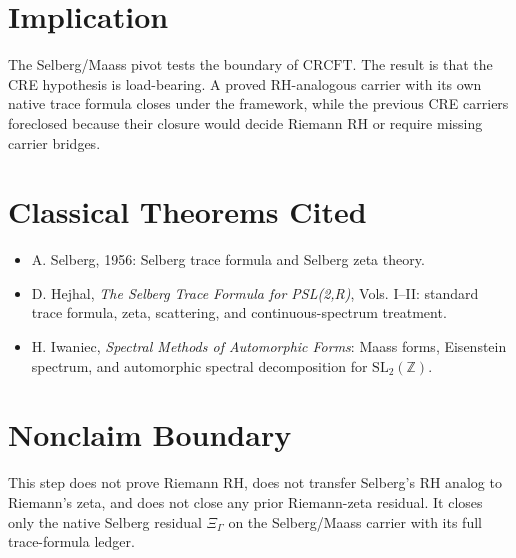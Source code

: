 \documentclass[11pt]{article}
\newcommand{\XiGamma}{\Xi_{\Gamma}}
\newcommand{\CRCFT}{\mathrm{CRCFT}}
\begin{document}
\section*{Implication}

The Selberg/Maass pivot tests the boundary of \(\CRCFT\).  The result is that
the CRE hypothesis is load-bearing.  A proved RH-analogous carrier with its
own native trace formula closes under the framework, while the previous CRE
carriers foreclosed because their closure would decide Riemann RH or require
missing carrier bridges.

\section*{Classical Theorems Cited}

\begin{itemize}
\item A. Selberg, 1956: Selberg trace formula and Selberg zeta theory.
\item D. Hejhal, \emph{The Selberg Trace Formula for PSL(2,R)}, Vols. I--II:
standard trace formula, zeta, scattering, and continuous-spectrum treatment.
\item H. Iwaniec, \emph{Spectral Methods of Automorphic Forms}: Maass forms,
Eisenstein spectrum, and automorphic spectral decomposition for
\(\mathrm{SL}_2(\mathbb Z)\).
\end{itemize}

\section*{Nonclaim Boundary}

This step does not prove Riemann RH, does not transfer Selberg's RH analog to
Riemann's zeta, and does not close any prior Riemann-zeta residual.  It closes
only the native Selberg residual \(\XiGamma\) on the Selberg/Maass carrier
with its full trace-formula ledger.
\end{document}
